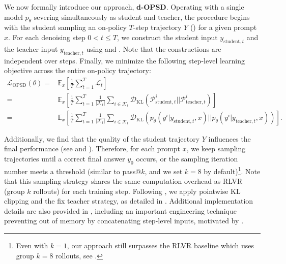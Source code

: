 \documentclass{article}
\begin{document}
We now formally introduce our approach, \textbf{d-OPSD}. Operating with a single model $p_\theta$ severing simultaneously as student and teacher, the procedure begins with the student sampling an on-policy $T$-step trajectory $Y$ () for a given prompt $x$. For each denoising step $0 <t \leq T$, we construct the student input $y_{\text{student},t}$ and the teacher input $y_{\text{teacher},t}$ using  and . Note that the constructions are independent over steps. Finally, we minimize the following step-level learning objective across the entire on-policy trajectory:
\begin{equation}
\begin{aligned}
    \mathcal{L}_\text{OPSD} (\theta) =& \mathbb{E}_x \left[ \frac{1}{T} \sum_{t=1}^T \mathcal{L}_t \right] \\
    =& \mathbb{E}_x \left[ \frac{1}{T} \sum_{t=1}^T \frac{1}{|\mathcal{K}_t|}  \sum_{i \in \mathcal{K}_t}  \mathcal{D}_\text{KL} \left(  \mathcal{P}_{\text{student}, t}^i || \mathcal{P}_{\text{teacher}, t}^i \right) \right] \\
    =& \mathbb{E}_x \left[ \frac{1}{T} \sum_{t=1}^T \frac{1}{|\mathcal{K}_t|}  \sum_{i \in \mathcal{K}_t}  \mathcal{D}_\text{KL} \left(  p_\theta \left(y^i|y_{\text{student},t}, x \right) || p_\theta \left(y^i|y_{\text{teacher},t}, x \right) \right) \right].
\end{aligned}
\label{eq12}
\end{equation}

Additionally, we find that the quality of the student trajectory $Y$ influences the final performance (see  and ). Therefore, for each prompt $x$, we keep sampling trajectories until a correct final answer $y_0$ occurs, or the sampling iteration number meets a threshold (similar to pass@$k$, and we set $k=8$ by default)\footnote{Even with $k=1$, our approach still surpasses the RLVR baseline which uses group $k=8$ rollouts, see .}. Note that this sampling strategy shares the same computation overhead as RLVR (group $k$ rollouts) for each training step. Following \citep{zhao2026self}, we apply pointwise KL clipping and the fix teacher strategy, as detailed in . Additional implementation details are also provided in , including an important engineering technique preventing out of memory by concatenating step-level inputs, motivated by \citep{wang2025revolutionizing}.
\end{document}
